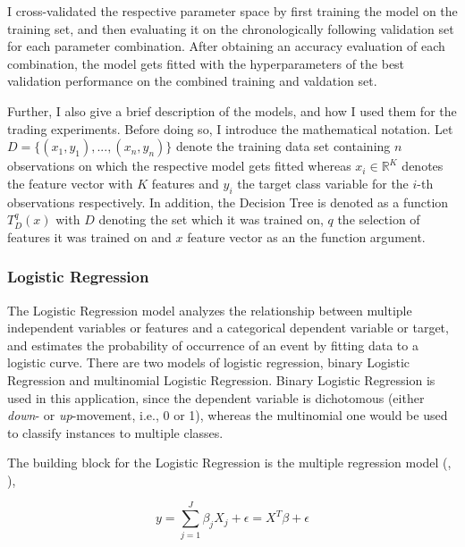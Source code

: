I cross-validated the respective parameter space by first training the model
on the training set, and then evaluating it on the chronologically following validation set for each parameter combination.
After obtaining an accuracy evaluation of each combination, the model gets fitted with the hyperparameters of the best validation performance on
the combined training and valdation set.

Further, I also give a brief description of the models, and how I used them for the trading experiments.
Before doing so, I introduce the mathematical notation. 
Let $ D = \{ (x_{1}, y_{1}), ..., (x_{n}, y_{n}) \} $ denote the training data set containing $ n $ observations on which the respective model gets fitted
whereas $ x_{i} \in \mathbb{R}^{K} $ denotes the feature vector with $K$ features and $ y_{i} $ the target class variable for the $ i $-th observations respectively.
In addition, the Decision Tree is denoted \cite{breiman1984decisionTree} as a function $ T_{D}^{q}(x) $ with $ D $ denoting the set which it was trained on,
$ q $ the selection of features it was trained on and $ x $ feature vector as an the function argument.




\subsubsection{Logistic Regression} \label{ch:logistic_regression}
The Logistic Regression model analyzes the relationship between multiple independent variables or features and a
categorical dependent variable or target, and estimates the probability of occurrence
of an event by fitting data to a logistic curve. There are two models
of logistic regression, binary Logistic Regression and multinomial Logistic
Regression. Binary Logistic Regression is used in this application, since the dependent
variable is dichotomous (either \emph{down}- or \emph{up}-movement, i.e., 0 or 1),
whereas the multinomial one would be used to classify instances to multiple classes.

The building block for the Logistic Regression is the multiple regression model (\cite{james2013statisticalLearning}, \cite{park2013logisticRegression}),


\begin{equation}
    y = \sum_{j=1}^{J} \beta_{j} X_{j} + \epsilon =  X^{T}\beta + \epsilon
\end{equation}

